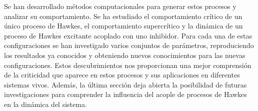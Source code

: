 Se han desarrollado métodos computacionales para generar estos procesos y analizar su comportamiento. Se ha estudiado el comportamiento crítico de un único proceso de Hawkes, el comportamiento
supercrítico y la dinámica de un proceso de Hawkes excitante acoplado con uno inhibidor. Para cada una de estas configuraciones se han investigado varios conjuntos de parámetros, reproduciendo 
los resultados ya conocidos y obteniendo nuevos conocimientos para las nuevas configuraciones. Estos descubrimientos nos proporcionan una mejor comprensión de la criticidad que aparece en 
estos procesos y sus aplicaciones en diferentes sistemas vivos. Además, la última sección deja abierta la posibilidad de futuras investigaciones para comprender la influencia del acople
de procesos de Hawkes en la dinámica del sistema.